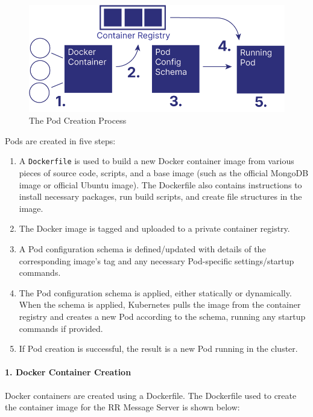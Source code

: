 \documentclass[12pt]{article}
\begin{document}
\begin{figure}[h!]

  \includegraphics[scale=.9]{pod_creation}
  \centering
  \caption{The Pod Creation Process}
  \label{podcreation:overview}
\end{figure}

Pods are created in five steps:

\begin{enumerate}
\item A \lstinline{Dockerfile} is used to build a new Docker container
  image from various pieces of source code, scripts, and a base image
  (such as the official MongoDB image or official Ubuntu image).  The
  Dockerfile also contains instructions to install necessary packages,
  run build scripts, and create file structures in the image.
\item The Docker image is tagged and uploaded to a private container
  registry.
\item A Pod configuration schema is defined/updated with details of
  the corresponding image's tag and any necessary Pod-specific
  settings/startup commands.
\item The Pod configuration schema is applied, either statically or
  dynamically.  When the schema is applied, Kubernetes pulls the image
  from the container registry and creates a new Pod according to the
  schema, running any startup commands if provided.
\item If Pod creation is successful, the result is a new Pod running
  in the cluster.
\end{enumerate}

\paragraph{1. Docker Container Creation}

Docker containers are created using a Dockerfile.  The Dockerfile used
to create the container image for the RR Message
Server is shown below:\\
\end{document}
